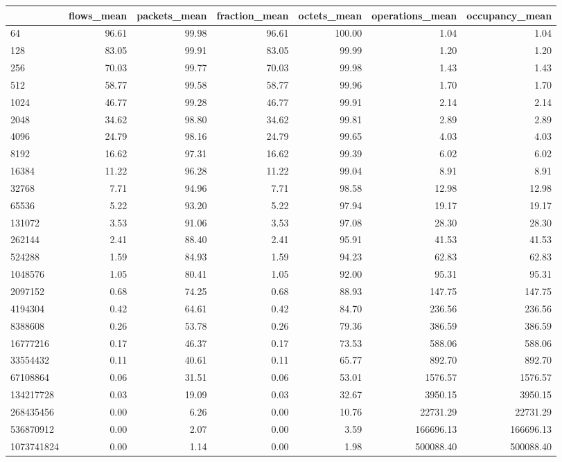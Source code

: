 \begin{tabular}{lrrrrrr}
\toprule
 & flows_mean & packets_mean & fraction_mean & octets_mean & operations_mean & occupancy_mean \\
\midrule
64 & 96.61 & 99.98 & 96.61 & 100.00 & 1.04 & 1.04 \\
128 & 83.05 & 99.91 & 83.05 & 99.99 & 1.20 & 1.20 \\
256 & 70.03 & 99.77 & 70.03 & 99.98 & 1.43 & 1.43 \\
512 & 58.77 & 99.58 & 58.77 & 99.96 & 1.70 & 1.70 \\
1024 & 46.77 & 99.28 & 46.77 & 99.91 & 2.14 & 2.14 \\
2048 & 34.62 & 98.80 & 34.62 & 99.81 & 2.89 & 2.89 \\
4096 & 24.79 & 98.16 & 24.79 & 99.65 & 4.03 & 4.03 \\
8192 & 16.62 & 97.31 & 16.62 & 99.39 & 6.02 & 6.02 \\
16384 & 11.22 & 96.28 & 11.22 & 99.04 & 8.91 & 8.91 \\
32768 & 7.71 & 94.96 & 7.71 & 98.58 & 12.98 & 12.98 \\
65536 & 5.22 & 93.20 & 5.22 & 97.94 & 19.17 & 19.17 \\
131072 & 3.53 & 91.06 & 3.53 & 97.08 & 28.30 & 28.30 \\
262144 & 2.41 & 88.40 & 2.41 & 95.91 & 41.53 & 41.53 \\
524288 & 1.59 & 84.93 & 1.59 & 94.23 & 62.83 & 62.83 \\
1048576 & 1.05 & 80.41 & 1.05 & 92.00 & 95.31 & 95.31 \\
2097152 & 0.68 & 74.25 & 0.68 & 88.93 & 147.75 & 147.75 \\
4194304 & 0.42 & 64.61 & 0.42 & 84.70 & 236.56 & 236.56 \\
8388608 & 0.26 & 53.78 & 0.26 & 79.36 & 386.59 & 386.59 \\
16777216 & 0.17 & 46.37 & 0.17 & 73.53 & 588.06 & 588.06 \\
33554432 & 0.11 & 40.61 & 0.11 & 65.77 & 892.70 & 892.70 \\
67108864 & 0.06 & 31.51 & 0.06 & 53.01 & 1576.57 & 1576.57 \\
134217728 & 0.03 & 19.09 & 0.03 & 32.67 & 3950.15 & 3950.15 \\
268435456 & 0.00 & 6.26 & 0.00 & 10.76 & 22731.29 & 22731.29 \\
536870912 & 0.00 & 2.07 & 0.00 & 3.59 & 166696.13 & 166696.13 \\
1073741824 & 0.00 & 1.14 & 0.00 & 1.98 & 500088.40 & 500088.40 \\
\bottomrule
\end{tabular}
